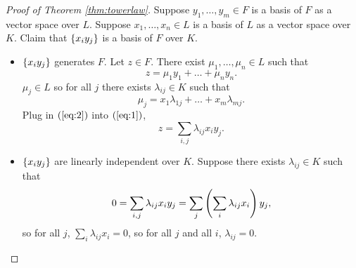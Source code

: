\begin{proof}[Proof of Theorem \ref{thm:towerlaw}]
Suppose $ y_1, \dots, y_m \in F $ is a basis of $ F $ as a vector space over $ L $. Suppose $ x_1, \dots, x_n \in L $ is a basis of $ L $ as a vector space over $ K $. Claim that $ \left\{ x_iy_j \right\} $ is a basis of $ F $ over $ K $.
\begin{itemize}
\item $ \left\{ x_iy_j \right\} $ generates $ F $. Let $ z \in F $. There exist $ \mu_1, \dots, \mu_n \in L $ such that
\begin{equation}
\label{eq:1}
z = \mu_1y_1 + \dots + \mu_ny_n.
\end{equation}
$ \mu_j \in L $ so for all $ j $ there exists $ \lambda_{ij} \in K $ such that
\begin{equation}
\label{eq:2}
\mu_j = x_1\lambda_{1j} + \dots + x_m\lambda_{mj}.
\end{equation}
Plug in $ \left( \ref{eq:2} \right) $ into $ \left( \ref{eq:1} \right) $,
$$ z = \sum_{i, j} \lambda_{ij}x_iy_j. $$
\item $ \left\{ x_iy_j \right\} $ are linearly independent over $ K $. Suppose there exists $ \lambda_{ij} \in K $ such that
$$ 0 = \sum_{i, j} \lambda_{ij}x_iy_j = \sum_j \left( \sum_i \lambda_{ij}x_i \right)y_j, $$
so for all $ j $, $ \sum_i \lambda_{ij}x_i = 0 $, so for all $ j $ and all $ i $, $ \lambda_{ij} = 0 $.
\end{itemize}
\end{proof}

\pagebreak

